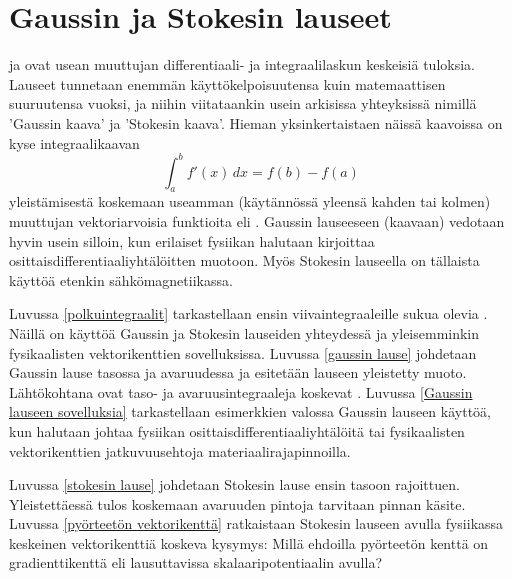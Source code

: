 \chapter{Gaussin ja Stokesin lauseet}

 ja  ovat usean muuttujan differentiaali- ja 
integraalilaskun keskeisiä tuloksia. Lauseet tunnetaan enemmän käyttökelpoisuutensa kuin 
matemaattisen suuruutensa vuoksi, ja niihin viitataankin usein arkisissa yhteyksissä nimillä 
'Gaussin kaava' ja 'Stokesin kaava'. Hieman yksinkertaistaen näissä kaavoissa on kyse 
integraalikaavan
\[
\int_a^b f'(x)\,dx=f(b)-f(a)
\]
yleistämisestä koskemaan useamman (käytännössä yleensä kahden tai kolmen) muuttujan 
vektoriarvoisia funktioita eli . Gaussin lauseeseen (kaavaan) vedotaan 
hyvin usein silloin, kun erilaiset fysiikan  halutaan kirjoittaa 
osittaisdifferentiaaliyhtälöitten muotoon. Myös Stokesin lauseella on tällaista käyttöä etenkin
sähkömagnetiikassa.

Luvussa \ref{polkuintegraalit} tarkastellaan ensin viivaintegraaleille sukua olevia
. Näillä on käyttöä Gaussin ja Stokesin lauseiden yhteydessä ja
yleisemminkin fysikaalisten vektorikenttien sovelluksissa. Luvussa \ref{gaussin lause}
johdetaan Gaussin lause tasossa ja avaruudessa ja esitetään lauseen yleistetty muoto.
Lähtökohtana ovat taso- ja avaruusintegraaleja koskevat . Luvussa
\ref{Gaussin lauseen sovelluksia} tarkastellaan esimerkkien valossa Gaussin lauseen käyttöä,
kun halutaan johtaa fysiikan osittaisdifferentiaaliyhtälöitä tai fysikaalisten vektorikenttien
jatkuvuusehtoja materiaalirajapinnoilla. 

Luvussa \ref{stokesin lause} johdetaan Stokesin lause ensin tasoon rajoittuen. Yleistettäessä
tulos koskemaan avaruuden pintoja tarvitaan pinnan  käsite. Luvussa 
\ref{pyörteetön vektorikenttä} ratkaistaan Stokesin lauseen avulla fysiikassa keskeinen 
vektorikenttiä koskeva kysymys: Millä ehdoilla pyörteetön kenttä on gradienttikenttä eli 
lausuttavissa skalaaripotentiaalin avulla? 
